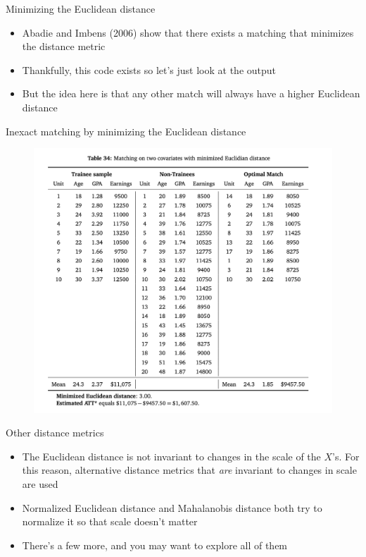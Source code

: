 \documentclass{beamer}
\begin{document}
\begin{frame}{Minimizing the Euclidean distance}

\begin{itemize}
\item Abadie and Imbens (2006) show that there exists a matching that minimizes the distance metric
\item Thankfully, this code exists so let's just look at the output
\item But the idea here is that any other match will always have a higher Euclidean distance
\end{itemize}

\end{frame}




\begin{frame}{Inexact matching by minimizing the Euclidean distance}

\begin{figure}[!t]\centering
\includegraphics[scale=0.45]{./lecture_includes/inexact_euclidean}
\end{figure}

\end{frame}

\begin{frame}{Other distance metrics}

\begin{itemize}
\item  The Euclidean distance is not invariant to changes in the scale of the $X$'s.  For this reason, alternative distance metrics that \emph{are} invariant to changes in scale are used
\item Normalized Euclidean distance and Mahalanobis distance both try to normalize it so that scale doesn't matter
\item There's a few more, and you may want to explore all of them
\end{itemize}

\end{frame}
\end{document}
